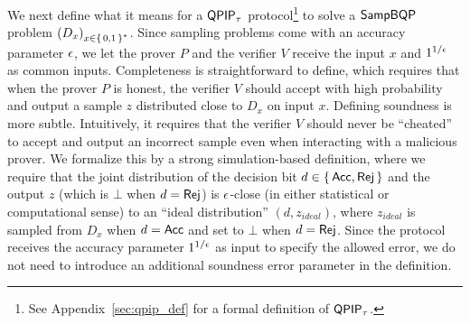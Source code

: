 
We next define what it means for a $\operatorname{\mathsf{QPIP}}_\tau$ protocol\footnote{See Appendix~\ref{sec:qpip_def} for a formal definition of $\operatorname{\mathsf{QPIP}}_\tau$.} to solve a $\operatorname{\mathsf{SampBQP}}$ problem $\left(D_x\right)_{x\in\set{0, 1}^*}$.
Since sampling problems come with an accuracy parameter $\epsilon$, we let the prover $P$ and the verifier $V$ receive the input $x$ and $1^{1/\epsilon}$ as common inputs. 
Completeness is straightforward to define, which requires that when the prover $P$ is honest, the verifier $V$ should accept with high probability and output a sample $z$ distributed close to $D_x$ on input $x$. Defining soundness is more subtle. Intuitively, it requires that the verifier $V$ should never be ``cheated'' to accept and output an incorrect sample even when interacting with a malicious prover. We formalize this by a strong simulation-based definition, where we require that the joint distribution of the decision bit $d \in \set{\mathsf{Acc}, \mathsf{Rej}}$ and the output $z$ (which is $\bot$ when $d = \mathsf{Rej}$) is $\epsilon$-close (in either statistical or computational sense) to an ``ideal distribution'' $(d,z_{ideal})$, where $z_{ideal}$ is sampled from $D_x$ when $d = \mathsf{Acc}$ and set to $\bot$ when $d = \mathsf{Rej}$. Since the protocol receives the accuracy parameter $1^{1/\epsilon}$ as input to specify the allowed error, we do not need to introduce an additional soundness error parameter in the definition.

